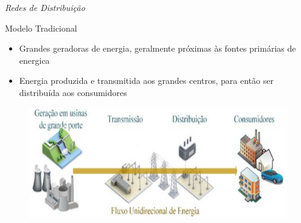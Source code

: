 \begin{frame}{\textit{Redes de Distribuição}}
  \begin{block}{Modelo Tradicional}
    \begin{itemize}
      \item Grandes geradoras de energia, geralmente próximas às fontes
      primárias de energica
      \item Energia produzida e transmitida aos grandes centros, para então ser
      distribuída aos consumidores
    \end{itemize}
  \end{block}
  \begin{figure}[h]
  	\begin{center}
      \includegraphics [scale=0.333]{./Figures/TraditionalGrid}
  	\end{center}
  \end{figure}
\end{frame}

